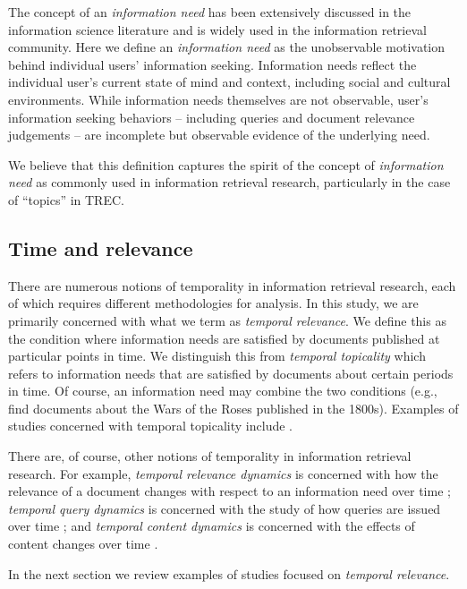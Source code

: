 \documentclass[runningheads,a4paper]{llncs}
\begin{document}
The concept of  an \emph{information need} has been extensively discussed in the information science literature and is widely used in the information retrieval community. Here we define an \emph{information need} as the unobservable motivation behind individual users' information seeking. Information needs reflect the individual user's current state of mind and context, including social and cultural environments. While information needs themselves are not observable, user's information seeking behaviors -- including queries and document relevance judgements -- are incomplete but observable evidence of the underlying need. 

We believe that this definition captures the spirit of the concept of \emph{information need} as commonly used in information retrieval research, particularly in the case of ``topics'' in TREC.

\subsection{Time and relevance}

There are numerous notions of temporality in information retrieval research, each of which requires different methodologies for analysis. In this study, we are primarily concerned with what we term as \emph{temporal relevance}. We define this as the condition where information needs are satisfied by documents published at particular points in time. We distinguish this from \emph{temporal topicality} which refers to information needs that are satisfied by documents about certain periods in time. Of course, an information need may combine the two conditions (e.g., find documents about the Wars of the Roses published in the 1800s). Examples of studies concerned with temporal topicality include \cite{Berberich2010,Kanhabua2011}.

There are, of course, other notions of temporality in information retrieval research. For example, \emph{temporal relevance dynamics} is concerned with how the relevance of a document changes with respect to an information need over time \cite{Mizzaro1997}; \emph{temporal query dynamics} is concerned with the study of how queries are issued over time \cite{Shokouhi2011,Vlachos2005,Parikh2008,Lavrenko2000}; and \emph{temporal content dynamics} is concerned with the effects of content changes over time \cite{Kulkarni2011}.

In the next section we review examples of studies focused on  \emph{temporal relevance}.
\end{document}
